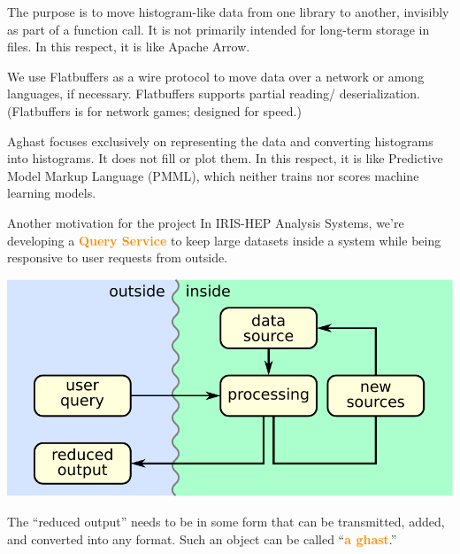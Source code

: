 \documentclass[aspectratio=169]{beamer}
\begin{document}
\begin{frame}{}
\vspace{1.25 cm}
\begin{description}\setlength{\itemsep}{0.5 cm}
\item[in-memory:] The purpose is to move histogram-like data from one library to another, invisibly as part of a function call. It is not primarily intended for long-term storage in files. In this respect, it is like Apache Arrow.

\item[serializable:]<2-> We use Flatbuffers as a wire protocol to move data over a network or among languages, if necessary. Flatbuffers supports partial reading/ deserialization. (Flatbuffers is for network games; designed for speed.)

\item[ontology:]<3-> Aghast focuses exclusively on representing the data and converting histograms into histograms. It does not fill or plot them. In this respect, it is like Predictive Model Markup Language (PMML), which neither trains nor scores machine learning models.
\end{description}
\end{frame}

\begin{frame}{Another motivation for the project}
\vspace{0.5 cm}
\large
In IRIS-HEP Analysis Systems, we're developing a \textcolor{darkorange}{\bf Query Service} to keep large datasets inside a system while being responsive to user requests from outside.

\begin{center}
\includegraphics[width=0.6\linewidth]{basic-block-diagram.pdf}
\end{center}

The ``reduced output'' needs to be in some form that can be transmitted, added, and converted into any format. Such an object can be called ``\textcolor{darkorange}{\bf a ghast}.''
\end{frame}
\end{document}
